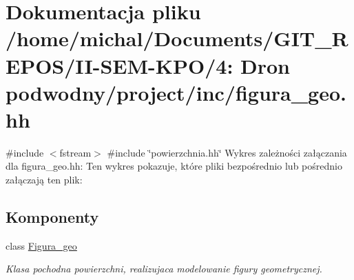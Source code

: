 \hypertarget{figura__geo_8hh}{}\section{Dokumentacja pliku /home/michal/\+Documents/\+G\+I\+T\+\_\+\+R\+E\+P\+O\+S/\+I\+I-\/\+S\+E\+M-\/\+K\+P\+O/4\+: Dron podwodny/project/inc/figura\+\_\+geo.hh}
\label{figura__geo_8hh}
{\ttfamily \#include $<$fstream$>$}\newline
{\ttfamily \#include \char`\"{}powierzchnia.\+hh\char`\"{}}\newline
Wykres zależności załączania dla figura\+\_\+geo.\+hh\+:
Ten wykres pokazuje, które pliki bezpośrednio lub pośrednio załączają ten plik\+:
\subsection*{Komponenty}
\begin{DoxyCompactItemize}
\item 
class \hyperlink{class_figura__geo}{Figura\+\_\+geo}
\begin{DoxyCompactList}\small\item\em Klasa pochodna powierzchni, realizujaca modelowanie figury geometrycznej. \end{DoxyCompactList}\end{DoxyCompactItemize}
